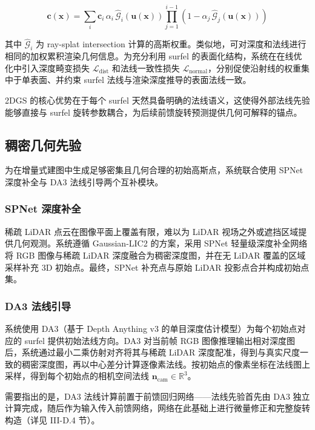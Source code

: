 \begin{equation}
\mathbf{c}(\mathbf{x}) = \sum_{i} \mathbf{c}_i \, \alpha_i \, \hat{\mathcal{G}}_i(\mathbf{u}(\mathbf{x})) \prod_{j=1}^{i-1} \left(1 - \alpha_j \, \hat{\mathcal{G}}_j(\mathbf{u}(\mathbf{x}))\right)
\end{equation}

其中 $\hat{\mathcal{G}}_i$ 为 ray-splat intersection 计算的高斯权重。类似地，可对深度和法线进行相同的加权累积渲染几何信息。为充分利用 surfel 的表面化结构，系统在在线优化中引入深度畸变损失 $\mathcal{L}_{\text{dist}}$ 和法线一致性损失 $\mathcal{L}_{\text{normal}}$，分别促使沿射线的权重集中于单表面、并约束 surfel 法线与渲染深度推导的表面法线一致。

2DGS 的核心优势在于每个 surfel 天然具备明确的法线语义，这使得外部法线先验能够直接与 surfel 旋转参数耦合，为后续前馈旋转预测提供几何可解释的锚点。

\subsection{稠密几何先验}

为在增量式建图中生成足够密集且几何合理的初始高斯点，系统联合使用 SPNet 深度补全与 DA3 法线引导两个互补模块。

\subsubsection{SPNet 深度补全}

稀疏 LiDAR 点云在图像平面上覆盖有限，难以为 LiDAR 视场之外或遮挡区域提供几何观测。系统遵循 Gaussian-LIC2 的方案，采用 SPNet 轻量级深度补全网络将 RGB 图像与稀疏 LiDAR 深度融合为稠密深度图，并在无 LiDAR 覆盖的区域采样补充 3D 初始点。最终，SPNet 补充点与原始 LiDAR 投影点合并构成初始点集。

\subsubsection{DA3 法线引导}

系统使用 DA3（基于 Depth Anything v3 的单目深度估计模型）为每个初始点对应的 surfel 提供初始法线方向。DA3 对当前帧 RGB 图像推理输出相对深度图后，系统通过最小二乘仿射对齐将其与稀疏 LiDAR 深度配准，得到与真实尺度一致的稠密深度图，再以中心差分计算逐像素法线。按初始点的像素坐标在法线图上采样，得到每个初始点的相机空间法线 $\mathbf{n}_{\text{cam}} \in \mathbb{R}^3$。

需要指出的是，DA3 法线计算前置于前馈回归网络——法线先验首先由 DA3 独立计算完成，随后作为输入传入前馈网络，网络在此基础上进行微量修正和完整旋转构造（详见 III-D.4 节）。

